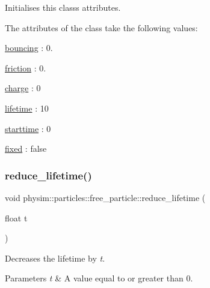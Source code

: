 Initialises this class\textquotesingle{}s attributes. 

The attributes of the class take the following values\+:
\begin{DoxyItemize}
\item \hyperlink{classphysim_1_1particles_1_1free__particle_aac766fa5294e47b944d32ca3e38d47fa}{bouncing} \+: 0.
\item \hyperlink{classphysim_1_1particles_1_1free__particle_a9e7dfd81e9392fc42b3faecb57afdc02}{friction} \+: 0.
\item \hyperlink{classphysim_1_1particles_1_1free__particle_a7513ac41f3cab1ce083f8695e2c73301}{charge} \+: 0
\item \hyperlink{classphysim_1_1particles_1_1free__particle_a5870d6fd3167d2c6120f887f45fe50fc}{lifetime} \+: 10
\item \hyperlink{classphysim_1_1particles_1_1free__particle_ad0379ba926ecc909bfbfb373045bfcf9}{starttime} \+: 0
\item \hyperlink{classphysim_1_1particles_1_1free__particle_a0f6d69caeac140abd74c7be4ed55eb74}{fixed} \+: false 
\end{DoxyItemize}\mbox{\label{classphysim_1_1particles_1_1free__particle_a8b8e76a24759a1e0a5d3b0d4933e31c1}} 
\subsubsection{\texorpdfstring{reduce\+\_\+lifetime()}{reduce\_lifetime()}}
{\footnotesize\ttfamily void physim\+::particles\+::free\+\_\+particle\+::reduce\+\_\+lifetime (\begin{DoxyParamCaption}\item[{float}]{t }\end{DoxyParamCaption})}



Decreases the lifetime by {\itshape t}. 


\begin{DoxyParams}{Parameters}
{\em t} & A value equal to or greater than 0. \\
\hline
\end{DoxyParams}
\mbox{\label{classphysim_1_1particles_1_1free__particle_a8f024371fb279e75bbfef1be83bce4bc}} 

